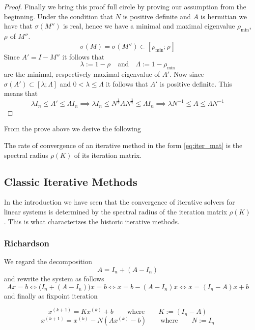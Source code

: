 \begin{proof}
   Finally we bring this proof full circle by proving our assumption from the beginning.
   Under the condition that \(N\) is positive definite and \(A\) is hermitian we have that \(\sigma(M'')\) is real, hence we have a minimal and maximal eigenvalue \(\rho_{\min}\), \(\rho_{}\) of \(M''\).
   \[\sigma(M) = \sigma(M'') \subset [\rho_{\min}; \rho_{}]\]
   Since \(A' = I - M''\) it follows that
   \[\lambda := 1 - \rho_{} \quad\text{and}\quad \Lambda := 1 - \rho_{\min}\]
   are the minimal, respectively maximal eigenvalue of \(A'\).
   Now since \(\sigma(A') \subset [\lambda; \Lambda]\) and \(0 < \lambda \leq \Lambda\) it follows that \(A'\) is positive definite.
   This means that
   \[\lambda I_n \leq A' \leq \Lambda I_n \implies \lambda I_n \leq N^\frac{1}{2}AN^\frac{1}{2} \leq \Lambda I_n \implies \lambda N^{-1} \leq A \leq \Lambda N^{-1}\]
\end{proof}

From the prove above we derive the following
\begin{definition}
   The rate of convergence of an iterative method in the form \cref{eq:iter_mat} is the spectral radius \(\rho(K)\) of its iteration matrix.
\end{definition}

\subsection{Classic Iterative Methods}
In the introduction we have seen that the convergence of iterative solvers for linear systems is determined by the spectral radius of the iteration matrix \(\rho(K)\).
This is what characterizes the historic iterative methods.

\subsubsection{Richardson}
We regard the decomposition
\[A = I_n + (A - I_n)\]
and rewrite the system as follows
\[Ax = b \iff \big(I_n + (A - I_n)\big)x = b \iff x = b - (A - I_n)x \iff x = (I_n - A)x + b\]
and finally as fixpoint iteration
\begin{definition}
   \[x^{(k+1)} = Kx^{(k)} + b \qquad\text{where}\qquad K := (I_n - A)\]
   \[x^{(k+1)} = x^{(k)} - N(Ax^{(k)} - b) \qquad\text{where}\qquad N := I_n\]
\end{definition}

